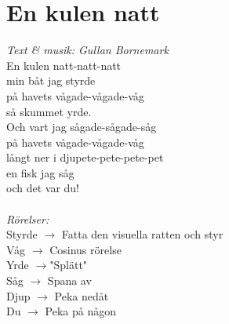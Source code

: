 \section{En kulen natt}
\textit{Text \& musik: Gullan Bornemark}
\vspace{2mm}\\
En kulen natt-natt-natt\\
min båt jag styrde\\
på havets vågade-vågade-våg\\
så skummet yrde.\\
Och vart jag sågade-sågade-såg\\
på havets vågade-vågade-våg\\
långt ner i djupete-pete-pete-pet\\
en fisk jag såg\\
och det var du!\\
\\
\textit{Rörelser:}\\
Styrde $\rightarrow$ Fatta den visuella ratten och styr\\
Våg $\rightarrow$ Cosinus rörelse\\
Yrde $\rightarrow$"Splätt"\\
Såg $\rightarrow$ Spana av\\
Djup $\rightarrow$ Peka nedåt\\
Du $\rightarrow$ Peka på någon\\

